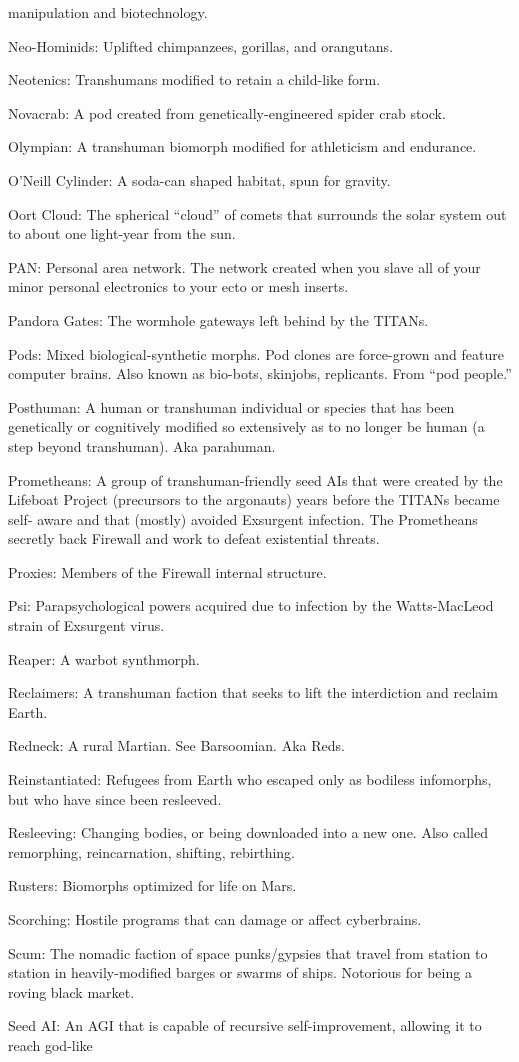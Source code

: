 manipulation and biotechnology. \item Neo-Hominids: Uplifted chimpanzees, gorillas, and orangutans. \item Neotenics: Transhumans modified to retain a child-like form. \item Novacrab: A pod created from genetically-engineered spider crab stock. \item Olympian: A transhuman biomorph modified for athleticism and endurance. \item O'Neill Cylinder: A soda-can shaped habitat, spun for gravity. \item Oort Cloud: The spherical ``cloud'' of comets that surrounds the solar system out to about one light-year from the sun. \item PAN: Personal area network. The network created when you slave all of your minor personal electronics to your ecto or mesh inserts. \item Pandora Gates: The wormhole gateways left behind by the TITANs. \item Pods: Mixed biological-synthetic morphs. Pod clones are force-grown and feature computer brains. Also known as bio-bots, skinjobs, replicants. From ``pod people.'' \item Posthuman: A human or transhuman individual or species that has been genetically or cognitively modified so extensively as to no longer be human (a step beyond transhuman). Aka parahuman. \item Prometheans: A group of transhuman-friendly seed AIs that were created by the Lifeboat Project (precursors to the argonauts) years before the TITANs became self- aware and that (mostly) avoided Exsurgent infection. The Prometheans secretly back Firewall and work to defeat existential threats. \item Proxies: Members of the Firewall internal structure. \item Psi: Parapsychological powers acquired due to infection by the Watts-MacLeod strain of Exsurgent virus. \item Reaper: A warbot synthmorph. \item Reclaimers: A transhuman faction that seeks to lift the interdiction and reclaim Earth. \item Redneck: A rural Martian. See Barsoomian. Aka Reds. \item Reinstantiated: Refugees from Earth who escaped only as bodiless infomorphs, but who have since been resleeved. \item Resleeving: Changing bodies, or being downloaded into a new one. Also called remorphing, reincarnation, shifting, rebirthing. \item Rusters: Biomorphs optimized for life on Mars. \item Scorching: Hostile programs that can damage or affect cyberbrains. \item Scum: The nomadic faction of space punks/gypsies that travel from station to station in heavily-modified barges or swarms of ships. Notorious for being a roving black market. \item Seed AI: An AGI that is capable of recursive self-improvement, allowing it to reach god-like 